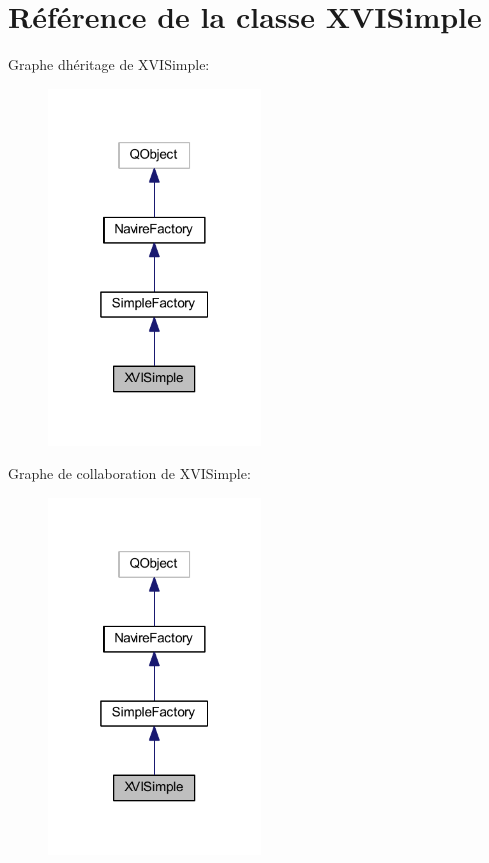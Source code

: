 \hypertarget{class_x_v_i_simple}{}\section{Référence de la classe X\+V\+I\+Simple}
\label{class_x_v_i_simple}


Graphe d\textquotesingle{}héritage de X\+V\+I\+Simple\+:
\nopagebreak
\begin{figure}[H]
\begin{center}
\leavevmode
\includegraphics[width=160pt]{class_x_v_i_simple__inherit__graph}
\end{center}
\end{figure}


Graphe de collaboration de X\+V\+I\+Simple\+:
\nopagebreak
\begin{figure}[H]
\begin{center}
\leavevmode
\includegraphics[width=160pt]{class_x_v_i_simple__coll__graph}
\end{center}
\end{figure}
